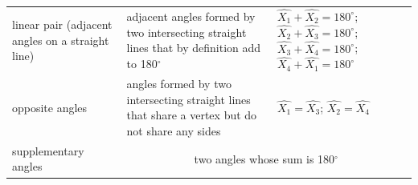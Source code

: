 {\begin{tabular}[t]{|l|l|l|}
        linear pair (adjacent angles on a straight line) &
        adjacent angles formed by two intersecting straight lines that by definition add to 180${}^{\circ }$ &
                  $\hat{{X}_{1}}+\hat{{X}_{2}}={180}^{\circ }$;
                  $\hat{{X}_{2}}+\hat{{X}_{3}}={180}^{\circ }$;
                  $\hat{{X}_{3}}+\hat{{X}_{4}}={180}^{\circ }$;
                  $\hat{{X}_{4}}+\hat{{X}_{1}}={180}^{\circ }$
     \tabularnewline\cline{1-1}\cline{2-2}\cline{3-3}
        opposite angles &
        angles formed by two intersecting straight lines that share a vertex but do not share any sides &
                  $\hat{{X}_{1}}=\hat{{X}_{3}}$;
                  $\hat{{X}_{2}}=\hat{{X}_{4}}$
     \tabularnewline\cline{1-1}\cline{2-2}\cline{3-3}
        supplementary angles &
    \multicolumn{2}{c|}{two angles whose sum is 180${}^{\circ }$}

\end{tabular}}
